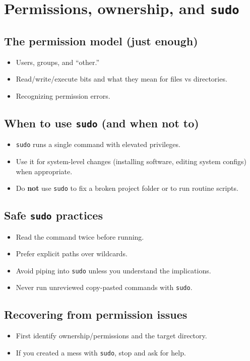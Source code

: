 \section{Permissions, ownership, and \texttt{sudo}}
\subsection{The permission model (just enough)}
\begin{itemize}
\item Users, groups, and ``other.''
\item Read/write/execute bits and what they mean for files vs directories.
\item Recognizing permission errors.
\end{itemize}

\subsection{When to use \texttt{sudo} (and when not to)}
\begin{itemize}
\item \texttt{sudo} runs a single command with elevated privileges.
\item Use it for system-level changes (installing software, editing system configs) when appropriate.
\item Do \textbf{not} use \texttt{sudo} to fix a broken project folder or to run routine scripts.
\end{itemize}

\subsection{Safe \texttt{sudo} practices}
\begin{itemize}
\item Read the command twice before running.
\item Prefer explicit paths over wildcards.
\item Avoid piping into \texttt{sudo} unless you understand the implications.
\item Never run unreviewed copy-pasted commands with \texttt{sudo}.
\end{itemize}

\subsection{Recovering from permission issues}
\begin{itemize}
\item First identify ownership/permissions and the target directory.
\item If you created a mess with \texttt{sudo}, stop and ask for help.
\end{itemize}

